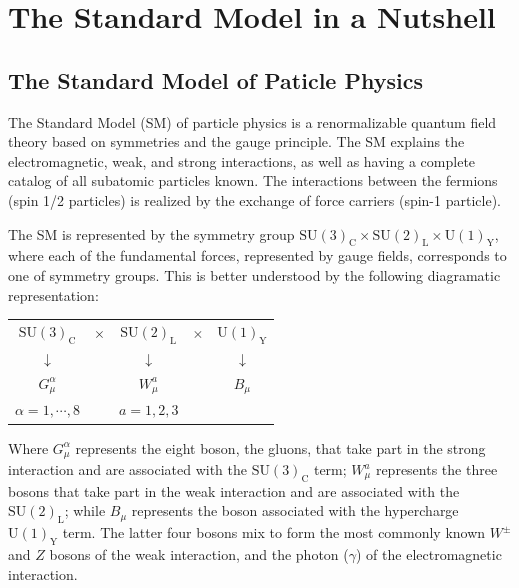 \chapter{The Standard Model in a Nutshell}
\section{The Standard Model of Paticle Physics}
The Standard Model (SM) of particle physics is a renormalizable
quantum field theory based on symmetries and the gauge principle. The
SM explains the electromagnetic, weak, and strong interactions, as
well as having a complete catalog of all subatomic particles
known. The interactions between the fermions (spin 1/2 particles) is
realized by the exchange of force carriers (spin-1 particle).

The SM is represented by the symmetry group $\mathrm{SU(3)_{C}} \times
\mathrm{SU(2)_{L}} \times \mathrm{U(1)_{Y}}$, where each of the
fundamental forces, represented by gauge fields, corresponds to one of
symmetry groups. This is better understood by the following
diagramatic representation:

\begin{center}
\begin{tabular}{ c c c c c }
  $\mathrm{SU(3)_{C}}$ & $\times$ & $\mathrm{SU(2)_{L}}$ & $\times$ & $\mathrm{U(1)_{Y}}$\\
  $\downarrow$ &  & $\downarrow$ & & $\downarrow$\\
  $G^{\alpha}_{\mu}$ &  & $W^{a}_{\mu}$& &$B_{\mu}$ \\
  $\alpha = 1,\cdots,8$ & & $a = 1,2,3$ & & \\
\end{tabular}
\end{center}

Where $G^{\alpha}_{\mu}$ represents the eight boson, the gluons, that take part in
the strong interaction and are associated with the
$\mathrm{SU(3)_{C}}$ term;  $W^{a}_{\mu}$ represents the three bosons
that take part in the weak interaction and are associated with the
$\mathrm{SU(2)_{L}}$; while $B_{\mu}$ represents the boson associated
with the hypercharge $\mathrm{U(1)_{Y}}$ term. The latter four bosons
mix to form the most commonly known $W^{\pm}$ and $Z$ bosons of the
weak interaction, and the photon ($\gamma$) of the electromagnetic
interaction.

